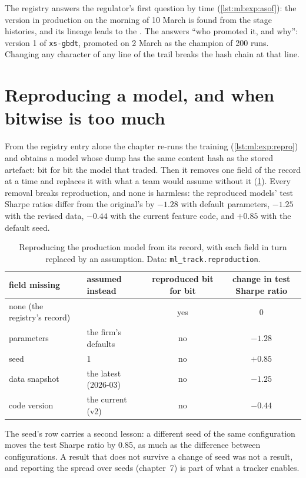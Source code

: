 The registry answers the regulator's first question by time (\cref{lst:ml:exp:asof}): the version in production on the morning
of 10 March is found from the stage histories, and its lineage leads to the . The  answers ``who promoted it,
and why'': version 1 of \texttt{xs-gbdt}, promoted on 2 March as the champion of 200 runs. Changing any character of any line of
the trail breaks the hash chain at that line.

\section{Reproducing a model, and when bitwise is too much}

From the registry entry alone the chapter re-runs the training (\cref{lst:ml:exp:repro}) and obtains a model whose dump has the
same content hash as the stored artefact: bit for bit the model that traded. Then it removes one field of the record at a time
and replaces it with what a team would assume without it (\cref{tab:ml:exp:ablation}). Every removal breaks reproduction, and
none is harmless: the reproduced models' test Sharpe ratios differ from the original's by $-1.28$ with default parameters,
$-1.25$ with the revised data, $-0.44$ with the current feature code, and $+0.85$ with the default seed.

\begin{table}[htbp]
\centering\small
\begin{tabular}{@{}llcc@{}}
\toprule
field missing & assumed instead & reproduced bit for bit & change in test Sharpe ratio\\
\midrule
none (the registry's record) & & yes & 0\\
parameters & the firm's defaults & no & $-1.28$\\
seed & 1 & no & $+0.85$\\
data snapshot & the latest (2026-03) & no & $-1.25$\\
code version & the current (v2) & no & $-0.44$\\
\bottomrule
\end{tabular}
\caption{Reproducing the production model from its record, with each field in turn replaced by an assumption. Data:
\texttt{ml\_track.reproduction}.}\label{tab:ml:exp:ablation}
\end{table}

The seed's row carries a second lesson: a different seed of the same configuration moves the test Sharpe ratio by 0.85, as
much as the difference between configurations. A result that does not survive a change of seed was not a result, and reporting
the spread over seeds (chapter~7) is part of what a tracker enables.

